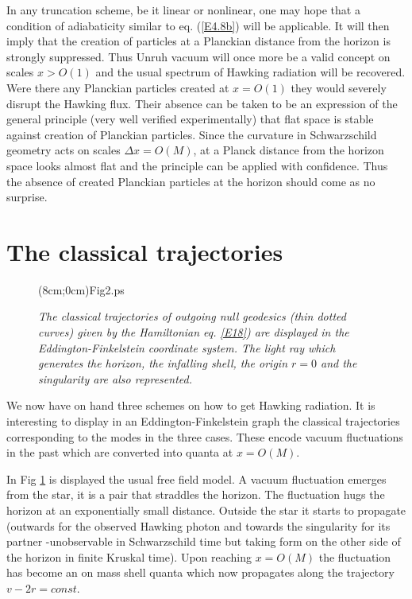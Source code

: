 \documentclass[12pt]{article}
\newcommand{\figprov}[4]{
\begin{figure}[hbt]
\begin{center}\mbox{\psboxto(#1;0cm){#4}}\end{center}
\caption{\it #3}
\label{#2}
\end{figure}
}
\begin{document}
In any truncation scheme, be it linear or nonlinear, one may hope that
a condition of adiabaticity similar to  eq. (\ref{E4.8b}) will be
applicable. It will then imply that the creation of particles at a
Planckian distance from the horizon is strongly suppressed. Thus Unruh
vacuum will once more be a valid concept on scales $x>O(1)$ and the
usual spectrum of Hawking radiation will be recovered. Were there any
Planckian particles created at $x=O(1)$ they would severely disrupt the
Hawking flux. Their absence can be taken to be an expression of the
general principle (very well verified experimentally) that flat space
is stable against creation of Planckian particles. Since the curvature
in Schwarzschild geometry acts on scales $\Delta x =O(M)$, at a Planck
distance from the horizon space looks almost flat and the
principle can be applied with confidence. Thus the absence of created
Planckian particles at the horizon should come as no surprise.

\section{The classical trajectories}\label{SS6}


\figprov{8cm}{Ufiga}{The classical trajectories of outgoing null geodesics
(thin dotted curves) given by the Hamiltonian eq. \protect\ref{E18}) are
displayed in the Eddington-Finkelstein coordinate system. The light ray which
generates the horizon, the infalling shell, the origin $r=0$
and the singularity are also represented.}{Fig2.ps} 




We now have on hand three schemes on how to get Hawking radiation. It is
interesting to display in an Eddington-Finkelstein graph the classical trajectories corresponding
to the modes in the three cases. These encode vacuum fluctuations in the past
which are converted into quanta at $x= O(M)$. 

In Fig \ref{Ufiga} is displayed
the usual free field model. A vacuum fluctuation emerges from the star, it is a
pair that straddles the horizon. The fluctuation hugs the horizon at an
exponentially small distance. Outside the star it starts to propagate (outwards
for the observed Hawking photon and towards the singularity for its partner
-unobservable in Schwarzschild time but taking form on the other side of the
horizon in finite Kruskal time). Upon reaching $x=O(M)$ the fluctuation has
become an on mass shell quanta which now propagates along the trajectory $v-2r
=const$.
\end{document}
